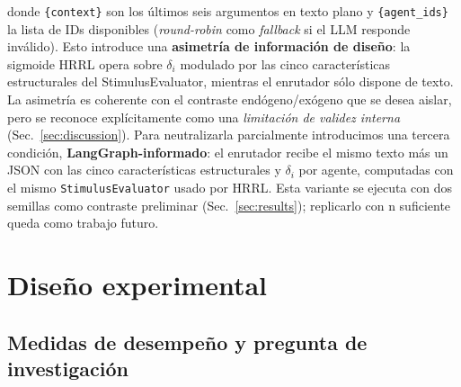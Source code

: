 \documentclass{llncs}
\begin{document}
\noindent donde \texttt{\{context\}} son los \'ultimos seis argumentos en
texto plano y \texttt{\{agent\_ids\}} la lista de IDs disponibles
(\emph{round-robin} como \emph{fallback} si el LLM responde inv\'alido).
Esto introduce una \textbf{asimetr\'ia de informaci\'on de dise\~no}: la
sigmoide HRRL opera sobre $\delta_i$ modulado por las cinco
caracter\'isticas estructurales del StimulusEvaluator, mientras el
enrutador s\'olo dispone de texto. La asimetr\'ia es coherente con el
contraste end\'ogeno/ex\'ogeno que se desea aislar, pero se reconoce
expl\'icitamente como una \emph{limitaci\'on de validez interna}
(Sec.~\ref{sec:discussion}). Para neutralizarla parcialmente
introducimos una tercera condici\'on, \textbf{LangGraph-informado}:
el enrutador recibe el mismo texto m\'as un JSON con las cinco
caracter\'isticas estructurales y $\delta_i$ por agente, computadas
con el mismo \texttt{StimulusEvaluator} usado por HRRL. Esta variante
se ejecuta con dos semillas como contraste preliminar
(Sec.~\ref{sec:results}); replicarlo con n suficiente queda como
trabajo futuro.

\section{Dise\~no experimental}
\label{sec:setup}

\subsection{Medidas de desempe\~no y pregunta de investigaci\'on}
\end{document}

